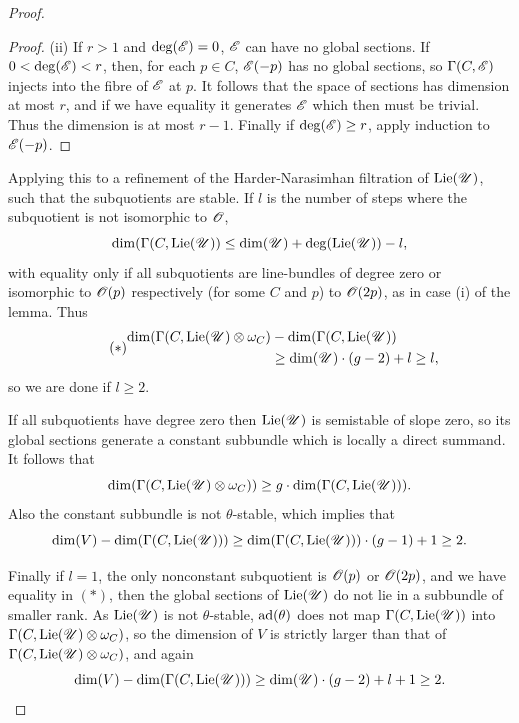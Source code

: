 \documentclass[12pt,english]{smfart}
\theoremstyle{plain} \newtheorem{innerthm}{Theorem} \newtheorem{innerlem}{Lemma} \newtheorem{innerprop}{Proposition} \newtheorem{innercor}{Corollary} \theoremstyle{definition} \newtheorem{innerdefn}{Definition} \newtheorem{innerconstr}{Construction} \theoremstyle{remark} \newtheorem*{remark}{Remark} \newtheorem*{remarks}{Remarks} \newtheorem*{applications}{Applications}
\begin{document}
\begin{proof}
\begin{proof}
(ii) If $r>1$ and $\deg(\mathscr{E})=0$, $\mathscr{E}$ can have no global sections. If $0<\deg(\mathscr{E})<r$, then, for each $p\in C$, $\mathscr{E}(-p)$ has no global sections, so $\Gamma(C,\mathscr{E})$ injects into the fibre of $\mathscr{E}$ at $p$. It follows that the space of sections has dimension at most $r$, and if we have equality it generates $\mathscr{E}$ which then must be trivial. Thus the dimension is at most $r-1$. Finally if $\deg(\mathscr{E})\ge r$, apply induction to $\mathscr{E}(-p)$.
\end{proof}

Applying this to a refinement of the Harder-Narasimhan filtration of $\operatorname{Lie}(\mathscr{U})$, such that the subquotients are stable. If $l$ is the number of steps where the subquotient is not isomorphic to $\mathscr{O}$,
\[
\dim(\Gamma(C,\operatorname{Lie}(\mathscr{U}))\le\dim(\mathscr{U})+\deg(\operatorname{Lie}(\mathscr{U}))-l,
\]
with equality only if all subquotients are line-bundles of degree zero or isomorphic to $\mathscr{O}(p)$ respectively (for some $C$ and $p$) to $\mathscr{O}(2p)$, as in case (i) of the lemma. Thus
\begin{equation*}\tag{$*$}
\begin{split}
\dim(\Gamma(C,\operatorname{Lie}(\mathscr{U})\otimes\omega_C)&-\dim(\Gamma(C,\operatorname{Lie}(\mathscr{U}))\\
&\ge\dim(\mathscr{U})\cdot(g-2)+l\ge l,
\end{split}
\end{equation*}
so we are done if $l\ge 2$.

If all subquotients have degree zero then $\operatorname{Lie}(\mathscr{U})$ is semistable of slope zero, so its global sections generate a constant subbundle which is locally
a direct summand. It follows that
\[
\dim(\Gamma(C,\operatorname{Lie}(\mathscr{U})\otimes\omega_C))\ge g\cdot\dim(\Gamma(C,\operatorname{Lie}(\mathscr{U}))).
\]
Also the constant subbundle is not $\theta$-stable, which implies that
\[
\dim(V)-\dim(\Gamma(C,\operatorname{Lie}(\mathscr{U})))\ge\dim(\Gamma(C,\operatorname{Lie}(\mathscr{U})))\cdot(g-1)+1\ge 2.
\]

Finally if $l=1$, the only nonconstant subquotient is $\mathscr{O}(p)$ or $\mathscr{O}(2p)$, and we have equality in $(*)$, then the global sections of $\operatorname{Lie}(\mathscr{U})$ do not lie in a subbundle of smaller rank. As $\operatorname{Lie}(\mathscr{U})$ is not $\theta$-stable, $\operatorname{ad}(\theta)$ does not map $\Gamma(C,\operatorname{Lie}(\mathscr{U}))$ into $\Gamma(C,\operatorname{Lie}(\mathscr{U})\otimes\omega_C)$, so the dimension of $V$ is strictly larger than that of $\Gamma(C,\operatorname{Lie}(\mathscr{U})\otimes\omega_C)$, and again
\[
\dim(V)-\dim(\Gamma(C,\operatorname{Lie}(\mathscr{U})))\ge\dim(\mathscr{U})\cdot(g-2)+l+1\ge 2.
\]


\end{proof}
\end{document}
